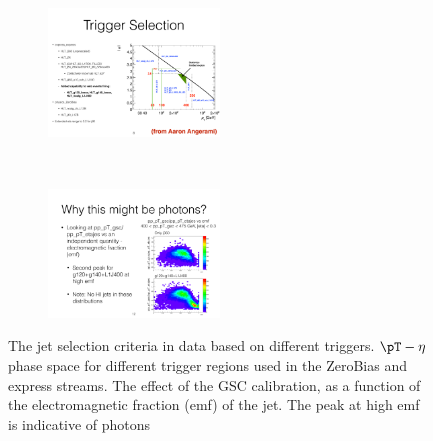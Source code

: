 


\begin{figure}
\centering
\begin{subfigure}[b]{\textwidth}
    \centering
    \includegraphics[width=0.5\textwidth]{figures/qualification/TrigMap.pdf}
    \caption{}
    \label{fig:trigmap_a}
\end{subfigure} \\
\begin{subfigure}[b]{\textwidth}
    \centering
    \includegraphics[width=0.5\textwidth]{figures/qualification/PhotonEx.pdf}
    \caption{}
    \label{fig:trigmap_b}
\end{subfigure}\hfill
   \caption{The jet selection criteria in data based on different triggers. \protect{} $\pT-\eta$ phase space for different trigger regions used in the ZeroBias and express streams. \protect{}The effect of the GSC calibration, as a function of the electromagnetic fraction (emf) of the jet. The peak at high emf is indicative of photons }
\label{fig:TrigMap}
\end{figure}


